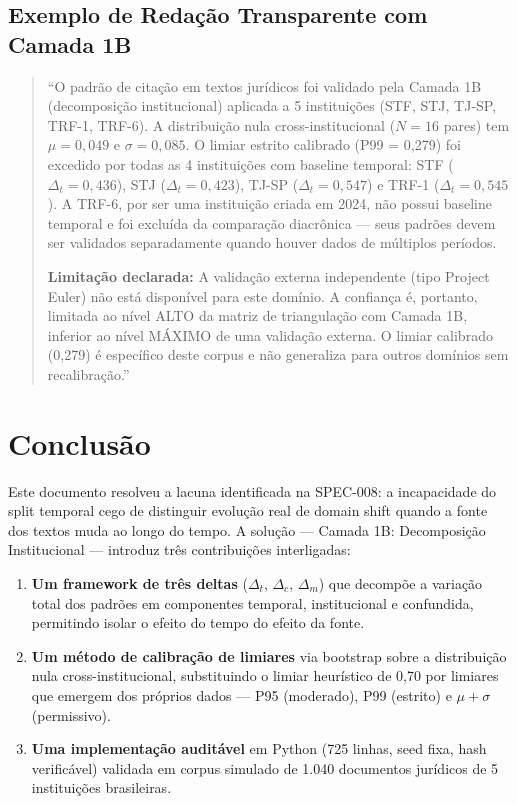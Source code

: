 \documentclass[12pt,a4paper]{article}
\theoremstyle{remark}
\begin{document}
\subsection{Exemplo de Redação Transparente com Camada 1B}

\begin{quote}\small
``O padrão de citação em textos jurídicos foi validado pela Camada 1B (decomposição institucional) aplicada a 5 instituições (STF, STJ, TJ-SP, TRF-1, TRF-6). A distribuição nula cross-institucional ($N = 16$ pares) tem $\mu = 0,049$ e $\sigma = 0,085$. O limiar estrito calibrado (P99 = 0,279) foi excedido por todas as 4 instituições com baseline temporal: STF ($\Delta_t = 0,436$), STJ ($\Delta_t = 0,423$), TJ-SP ($\Delta_t = 0,547$) e TRF-1 ($\Delta_t = 0,545$). A TRF-6, por ser uma instituição criada em 2024, não possui baseline temporal e foi excluída da comparação diacrônica — seus padrões devem ser validados separadamente quando houver dados de múltiplos períodos.

\textbf{Limitação declarada:} A validação externa independente (tipo Project Euler) não está disponível para este domínio. A confiança é, portanto, limitada ao nível ALTO da matriz de triangulação com Camada 1B, inferior ao nível MÁXIMO de uma validação externa. O limiar calibrado (0,279) é específico deste corpus e não generaliza para outros domínios sem recalibração.''
\end{quote}

\newpage

\section{Conclusão}

Este documento resolveu a lacuna identificada na SPEC-008: a incapacidade do split temporal cego de distinguir evolução real de domain shift quando a fonte dos textos muda ao longo do tempo. A solução — Camada 1B: Decomposição Institucional — introduz três contribuições interligadas:

\begin{enumerate}[nosep]
  \item \textbf{Um framework de três deltas} ($\Delta_t$, $\Delta_c$, $\Delta_m$) que decompõe a variação total dos padrões em componentes temporal, institucional e confundida, permitindo isolar o efeito do tempo do efeito da fonte.

  \item \textbf{Um método de calibração de limiares} via bootstrap sobre a distribuição nula cross-institucional, substituindo o limiar heurístico de 0,70 por limiares que emergem dos próprios dados — P95 (moderado), P99 (estrito) e $\mu+\sigma$ (permissivo).

  \item \textbf{Uma implementação auditável} em Python (725 linhas, seed fixa, hash verificável) validada em corpus simulado de 1.040 documentos jurídicos de 5 instituições brasileiras.
\end{enumerate}
\end{document}
